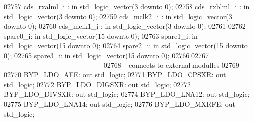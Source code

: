 \begin{DoxyCode}
02757     cds\_rxalml\_i    :   \textcolor{keywordflow}{in} \textcolor{comment}{std\_logic\_vector}(\textcolor{vhdllogic}{}\textcolor{vhdllogic}{3} \textcolor{keywordflow}{downto} \textcolor{vhdllogic}{}\textcolor{vhdllogic}{0});
02758     cds\_rxblml\_i    :   \textcolor{keywordflow}{in} \textcolor{comment}{std\_logic\_vector}(\textcolor{vhdllogic}{}\textcolor{vhdllogic}{3} \textcolor{keywordflow}{downto} \textcolor{vhdllogic}{}\textcolor{vhdllogic}{0});
02759     cds\_mclk2\_i    :    \textcolor{keywordflow}{in} \textcolor{comment}{std\_logic\_vector}(\textcolor{vhdllogic}{}\textcolor{vhdllogic}{3} \textcolor{keywordflow}{downto} \textcolor{vhdllogic}{}\textcolor{vhdllogic}{0});
02760     cds\_mclk1\_i    :    \textcolor{keywordflow}{in} \textcolor{comment}{std\_logic\_vector}(\textcolor{vhdllogic}{}\textcolor{vhdllogic}{3} \textcolor{keywordflow}{downto} \textcolor{vhdllogic}{}\textcolor{vhdllogic}{0});
02761 
02762     spare0\_i:   \textcolor{keywordflow}{in} \textcolor{comment}{std\_logic\_vector}(\textcolor{vhdllogic}{}\textcolor{vhdllogic}{15} \textcolor{keywordflow}{downto} \textcolor{vhdllogic}{}\textcolor{vhdllogic}{0});
02763     spare1\_i:   \textcolor{keywordflow}{in} \textcolor{comment}{std\_logic\_vector}(\textcolor{vhdllogic}{}\textcolor{vhdllogic}{15} \textcolor{keywordflow}{downto} \textcolor{vhdllogic}{}\textcolor{vhdllogic}{0});
02764     spare2\_i:   \textcolor{keywordflow}{in} \textcolor{comment}{std\_logic\_vector}(\textcolor{vhdllogic}{}\textcolor{vhdllogic}{15} \textcolor{keywordflow}{downto} \textcolor{vhdllogic}{}\textcolor{vhdllogic}{0});
02765     spare3\_i:   \textcolor{keywordflow}{in} \textcolor{comment}{std\_logic\_vector}(\textcolor{vhdllogic}{}\textcolor{vhdllogic}{15} \textcolor{keywordflow}{downto} \textcolor{vhdllogic}{}\textcolor{vhdllogic}{0});
02766 
02767 \textcolor{keyword}{    ------------------------------------------}
02768 \textcolor{keyword}{    -- connects to external modulles}
02769     
02770     BYP\_LDO\_AFE:    \textcolor{keywordflow}{out} \textcolor{comment}{std\_logic};
02771     BYP\_LDO\_CPSXR:  \textcolor{keywordflow}{out} \textcolor{comment}{std\_logic};
02772     BYP\_LDO\_DIGSXR: \textcolor{keywordflow}{out} \textcolor{comment}{std\_logic};
02773     BYP\_LDO\_DIVSXR: \textcolor{keywordflow}{out} \textcolor{comment}{std\_logic};
02774     BYP\_LDO\_LNA12:  \textcolor{keywordflow}{out} \textcolor{comment}{std\_logic};
02775     BYP\_LDO\_LNA14:  \textcolor{keywordflow}{out} \textcolor{comment}{std\_logic};
02776     BYP\_LDO\_MXRFE:  \textcolor{keywordflow}{out} \textcolor{comment}{std\_logic};

\end{DoxyCode}

